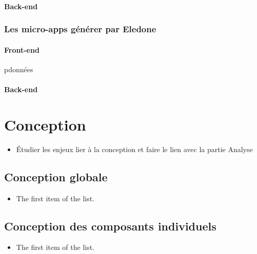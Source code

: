 \documentclass{rapport_stage}
\begin{document}
\subsection*{Back-end}

\section{Les micro-apps générer par Eledone}

\subsection*{Front-end}

\gls{pdonnées}

\subsection*{Back-end}




\part{Conception}

\begin{itemize}[label=$\bullet$]
  \item Étudier les enjeux lier à la conception et faire le lien avec la partie Analyse
\end{itemize}

\chapter{Conception globale}

\begin{itemize}[label=$\bullet$]
  \item The first item of the list.
\end{itemize}

\chapter{Conception des composants individuels}

\begin{itemize}[label=$\bullet$]
  \item The first item of the list.
\end{itemize}
\end{document}
